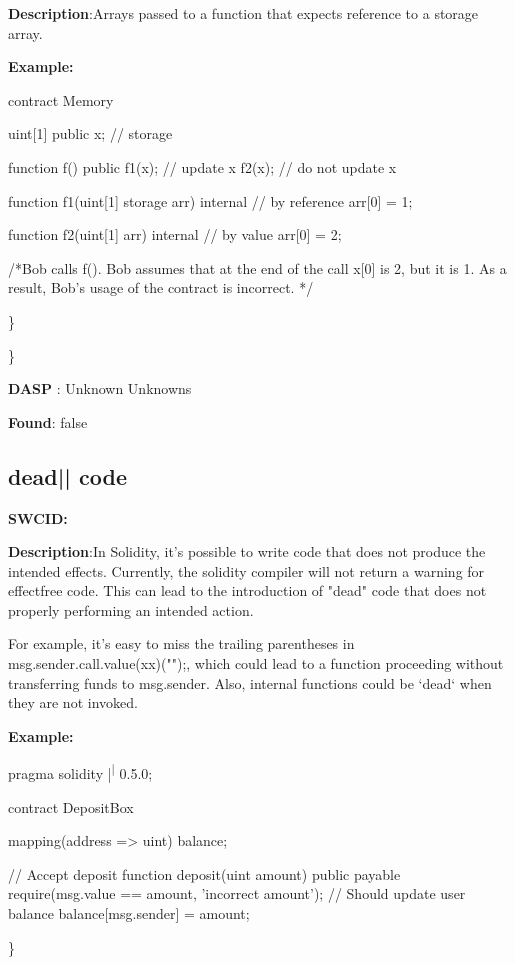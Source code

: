 \documentclass{article}
\begin{document}
\textbf{Description}:Arrays passed to a function that expects reference to a storage array.


\textbf{Example:} 
\begin{ffcode} 

contract Memory {
    uint[1] public x; // storage

    function f() public {
        f1(x); // update x
        f2(x); // do not update x
    }

    function f1(uint[1] storage arr) internal { // by reference
        arr[0] = 1;
    }

    function f2(uint[1] arr) internal { // by value
        arr[0] = 2;
    }
}

 /*Bob calls f(). Bob assumes that at the end of the call x[0] is 2, but it is 1. As a result, Bob's usage of the contract is incorrect. */ 

\end{ffcode} 
\} 

\} 

\textbf{DASP} : Unknown Unknowns

\textbf{Found}: false

\subsection{dead{|\textunderscore| }code} 
\textbf{SWC{\textunderscore }ID:} 

\textbf{Description}:In Solidity, it's possible to write code that does not produce the intended effects. Currently, the solidity compiler will not return a warning for effect{\textendash}free code. This can lead to the introduction of "dead" code that does not properly performing an intended action.

For example, it's easy to miss the trailing parentheses in msg.sender.call.value(xx)("");, which could lead to a function proceeding without transferring funds to msg.sender. Also, internal functions could be `dead` when they are not invoked.


\textbf{Example:} 
\begin{ffcode} 

pragma solidity |\textsuperscript| 0.5.0;

contract DepositBox {
    mapping(address => uint) balance;

    // Accept deposit
    function deposit(uint amount) public payable {
        require(msg.value == amount, 'incorrect amount');
        // Should update user balance
        balance[msg.sender] = amount;
    }
}

\end{ffcode} 
\} 
\end{document}

